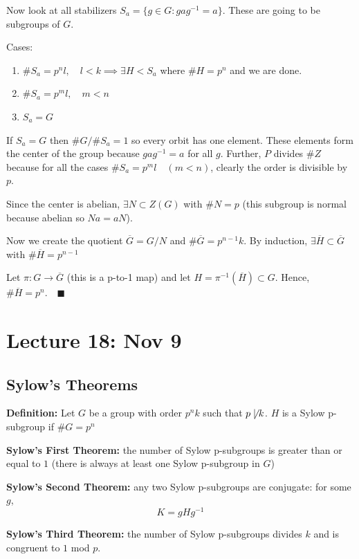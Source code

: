 \documentclass[12pt]{report}
\newcommand{\qed}{\quad \blacksquare}
\begin{document}
        Now look at all stabilizers $S_a = \{g\in G: gag^{-1} = a\}$. These are going to be subgroups of $G$. 

        Cases:
        \begin{enumerate}
            \item $\#S_a = p^nl, \quad l < k \implies \exists H< S_a$ where $\#H = p^n$ and we are done. 
            \item $\#S_a = p^m l, \quad m < n$
            \item $S_a = G$
        \end{enumerate}

        If $S_a = G$ then $\#G/\#S_a = 1$ so every orbit has one element. These elements form the center of the group because $gag^{-1} = a$ for all $g$. Further, $P$ divides $\#Z$ because for all the cases $\#S_a = p^m l \quad (m < n)$, clearly the order is divisible by $p$. 

        Since the center is abelian, $\exists N \subset Z(G)$ with $\#N = p$ (this subgroup is normal because abelian so $Na= aN$).  

        Now we create the quotient $\overline G = G/N$ and $\#\overline G = p^{n-1}k$. By induction, $\exists \overline H \subset \overline G$ with $\#\overline H = p^{n-1}$ 

        Let $\pi: G \to \overline G$ (this is a p-to-1 map) and let $H = \pi^{-1}(\overline H) \subset G$. Hence, $\# \overline H = p^n. \qed$

\section*{Lecture 18: Nov 9}
    \subsection*{Sylow's Theorems}
        \textbf{Definition:} Let $G$ be a group with order $p^nk$ such that $p \not \mid k$. $H$ is a Sylow p-subgroup if $\#G = p^n$

        \textbf{Sylow's First Theorem:} the number of Sylow p-subgroups is greater than or equal to $1$ (there is always at least one Sylow p-subgroup in $G$)

        \textbf{Sylow's Second Theorem:} any two Sylow p-subgroups are conjugate: for some $g$, 
        \[K = gHg^{-1}\]

        \textbf{Sylow's Third Theorem:} the number of Sylow p-subgroups divides $k$ and is congruent to $1$ mod $p$. 
\end{document}

